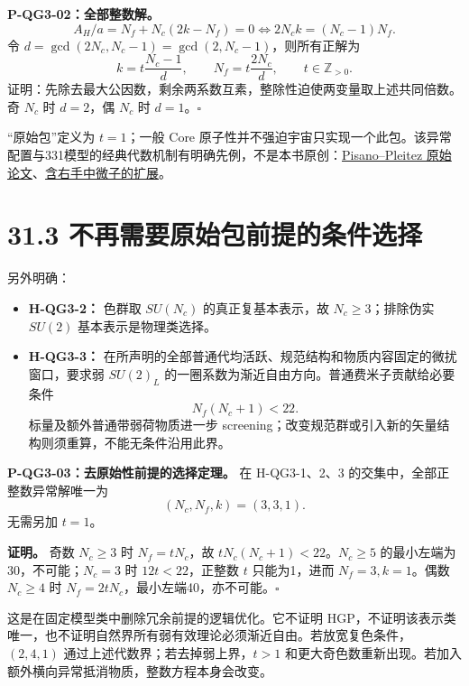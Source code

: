 \documentclass[
  11pt,
  oneside]{book}
\providecommand{\tightlist}{%
  \setlength{\itemsep}{0pt}\setlength{\parskip}{0pt}}
\begin{document}
\protect\hypertarget{p-qg3-02}{}{}

\textbf{P-QG3-02：全部整数解。} \[
A_H/a=N_f+N_c(2k-N_f)=0
\iff 2N_ck=(N_c-1)N_f.
\] 令 \(d=\gcd(2N_c,N_c-1)=\gcd(2,N_c-1)\)，则所有正解为 \[
k=t\frac{N_c-1}{d},\qquad N_f=t\frac{2N_c}{d},\qquad
t\in\mathbb Z_{>0}.
\]
证明：先除去最大公因数，剩余两系数互素，整除性迫使两变量取上述共同倍数。奇
\(N_c\) 时 \(d=2\)，偶 \(N_c\) 时 \(d=1\)。\(\square\)

``原始包''定义为 \(t=1\)；一般 Core
原子性并不强迫宇宙只实现一个此包。该异常配置与331模型的经典代数机制有明确先例，不是本书原创：\href{https://arxiv.org/abs/hep-ph/9206242}{Pisano--Pleitez
原始论文}、\href{https://link.aps.org/doi/10.1103/PhysRevD.50.R34}{含右手中微子的扩展}。

\hypertarget{ux4e0dux518dux9700ux8981ux539fux59cbux5305ux524dux63d0ux7684ux6761ux4ef6ux9009ux62e9}{%
\section{31.3
不再需要原始包前提的条件选择}\label{ux4e0dux518dux9700ux8981ux539fux59cbux5305ux524dux63d0ux7684ux6761ux4ef6ux9009ux62e9}}

另外明确：

\begin{itemize}
\tightlist
\item
  \textbf{H-QG3-2：} 色群取 \(SU(N_c)\) 的真正复基本表示，故
  \(N_c\ge3\)；排除伪实 \(SU(2)\) 基本表示是物理类选择。
\item
  \textbf{H-QG3-3：}
  在所声明的全部普通代均活跃、规范结构和物质内容固定的微扰窗口，要求弱
  \(SU(2)_L\) 的一圈系数为渐近自由方向。普通费米子贡献给必要条件 \[
  N_f(N_c+1)<22.
  \] 标量及额外普通带弱荷物质进一步
  screening；改变规范群或引入新的矢量结构则须重算，不能无条件沿用此界。
\end{itemize}

\protect\hypertarget{p-qg3-03}{}{}

\textbf{P-QG3-03：去原始性前提的选择定理。} 在 H-QG3-1、2、3
的交集中，全部正整数异常解唯一为 \[
(N_c,N_f,k)=(3,3,1).
\] 无需另加 \(t=1\)。

\textbf{证明。} 奇数 \(N_c\ge3\) 时 \(N_f=tN_c\)，故
\(tN_c(N_c+1)<22\)。\(N_c\ge5\) 的最小左端为30，不可能；\(N_c=3\) 时
\(12t<22\)，正整数 \(t\) 只能为1，进而 \(N_f=3,k=1\)。偶数 \(N_c\ge4\)
时 \(N_f=2tN_c\)，最小左端40，亦不可能。\(\square\)

这是在固定模型类中删除冗余前提的逻辑优化。它不证明
HGP，不证明该表示类唯一，也不证明自然界所有弱有效理论必须渐近自由。若放宽复色条件，\((2,4,1)\)
通过上述代数界；若去掉弱上界，\(t>1\)
和更大奇色数重新出现。若加入额外横向异常抵消物质，整数方程本身会改变。
\end{document}
